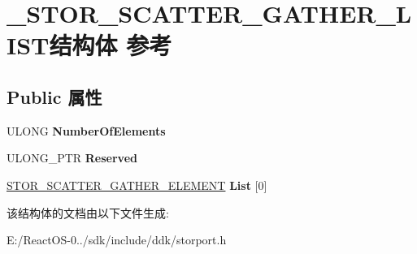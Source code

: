 \hypertarget{struct___s_t_o_r___s_c_a_t_t_e_r___g_a_t_h_e_r___l_i_s_t}{}\section{\+\_\+\+S\+T\+O\+R\+\_\+\+S\+C\+A\+T\+T\+E\+R\+\_\+\+G\+A\+T\+H\+E\+R\+\_\+\+L\+I\+S\+T结构体 参考}
\label{struct___s_t_o_r___s_c_a_t_t_e_r___g_a_t_h_e_r___l_i_s_t}
\subsection*{Public 属性}
\begin{DoxyCompactItemize}
\item 
\mbox{\label{struct___s_t_o_r___s_c_a_t_t_e_r___g_a_t_h_e_r___l_i_s_t_a079fca299c3ec39c73afe062b53cf67a}} 
U\+L\+O\+NG {\bfseries Number\+Of\+Elements}
\item 
\mbox{\label{struct___s_t_o_r___s_c_a_t_t_e_r___g_a_t_h_e_r___l_i_s_t_a957419b08a28c72ac84bfd263e15b35f}} 
U\+L\+O\+N\+G\+\_\+\+P\+TR {\bfseries Reserved}
\item 
\mbox{\label{struct___s_t_o_r___s_c_a_t_t_e_r___g_a_t_h_e_r___l_i_s_t_a16fe7cd0546f5baa8215558fdc2cb9d5}} 
\hyperlink{struct___s_t_o_r___s_c_a_t_t_e_r___g_a_t_h_e_r___e_l_e_m_e_n_t}{S\+T\+O\+R\+\_\+\+S\+C\+A\+T\+T\+E\+R\+\_\+\+G\+A\+T\+H\+E\+R\+\_\+\+E\+L\+E\+M\+E\+NT} {\bfseries List} \mbox{[}0\mbox{]}
\end{DoxyCompactItemize}


该结构体的文档由以下文件生成\+:\begin{DoxyCompactItemize}
\item 
E\+:/\+React\+O\+S-\/0../sdk/include/ddk/storport.\+h\end{DoxyCompactItemize}
